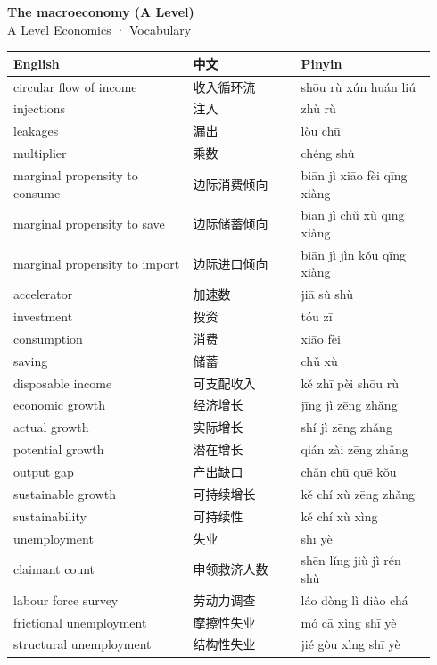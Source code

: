 \documentclass[11pt]{article}
\begin{document}
\begin{center}
  {\LARGE\bfseries The macroeconomy (A Level)}\\[0.35em]
  {\large A Level Economics · Vocabulary}
\end{center}
\vspace{0.6em}

\begin{longtable}{@{}p{0.40\linewidth}p{0.24\linewidth}p{0.30\linewidth}@{}}
\toprule
\textbf{English} & \textbf{中文} & \textbf{Pinyin} \\
\midrule
\endhead
\bottomrule
\endlastfoot
circular flow of income & 收入循环流 & shōu rù xún huán liú \\
injections & 注入 & zhù rù \\
leakages & 漏出 & lòu chū \\
multiplier & 乘数 & chéng shù \\
marginal propensity to consume & 边际消费倾向 & biān jì xiāo fèi qīng xiàng \\
marginal propensity to save & 边际储蓄倾向 & biān jì chǔ xù qīng xiàng \\
marginal propensity to import & 边际进口倾向 & biān jì jìn kǒu qīng xiàng \\
accelerator & 加速数 & jiā sù shù \\
investment & 投资 & tóu zī \\
consumption & 消费 & xiāo fèi \\
saving & 储蓄 & chǔ xù \\
disposable income & 可支配收入 & kě zhī pèi shōu rù \\
economic growth & 经济增长 & jīng jì zēng zhǎng \\
actual growth & 实际增长 & shí jì zēng zhǎng \\
potential growth & 潜在增长 & qián zài zēng zhǎng \\
output gap & 产出缺口 & chǎn chū quē kǒu \\
sustainable growth & 可持续增长 & kě chí xù zēng zhǎng \\
sustainability & 可持续性 & kě chí xù xìng \\
unemployment & 失业 & shī yè \\
claimant count & 申领救济人数 & shēn lǐng jiù jì rén shù \\
labour force survey & 劳动力调查 & láo dòng lì diào chá \\
frictional unemployment & 摩擦性失业 & mó cā xìng shī yè \\
structural unemployment & 结构性失业 & jié gòu xìng shī yè \\

\end{longtable}
\end{document}
